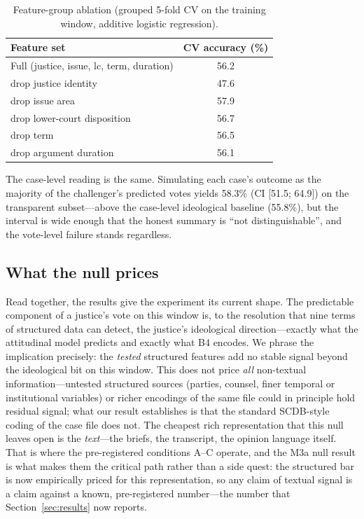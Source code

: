 \begin{table}[t]
\centering
\caption{Feature-group ablation (grouped 5-fold CV on the training
window, additive logistic regression).}
\label{tab:ablation}
\small
\begin{tabular}{@{}lc@{}}
\toprule
Feature set & CV accuracy (\%) \\
\midrule
Full (justice, issue, lc, term, duration) & 56.2 \\
drop justice identity & 47.6 \\
drop issue area & 57.9 \\
drop lower-court disposition & 56.7 \\
drop term & 56.5 \\
drop argument duration & 56.1 \\
\bottomrule
\end{tabular}
\end{table}

The case-level reading is the same. Simulating each case's outcome
as the majority of the challenger's predicted votes yields 58.3\%
(CI [51.5; 64.9]) on the transparent subset---above the case-level
ideological baseline (55.8\%), but the interval is wide enough that
the honest summary is ``not distinguishable'', and the vote-level
failure stands regardless.

\subsection{What the null prices}

Read together, the results give the experiment its current shape.
The predictable component of a justice's vote on this window is, to
the resolution that nine terms of structured data can detect, the
justice's ideological direction---exactly what the attitudinal
model predicts and exactly what B4 encodes. We phrase the
implication precisely: the \emph{tested} structured features add no
stable signal beyond the ideological bit on this window. This does
not price \emph{all} non-textual information---untested structured
sources (parties, counsel, finer temporal or institutional
variables) or richer encodings of the same file could in principle
hold residual signal; what our result establishes is that the
standard SCDB-style coding of the case file does not. The cheapest
rich representation that this null leaves open is the
\emph{text}---the
briefs, the transcript, the opinion language itself. That is where
the pre-registered conditions A--C operate, and the M3a null result
is what makes them the critical path rather than a side quest: the
structured bar is now empirically priced for this
representation, so any claim of textual signal is a claim
against a known, pre-registered number---the number that
Section~\ref{sec:results} now reports.
